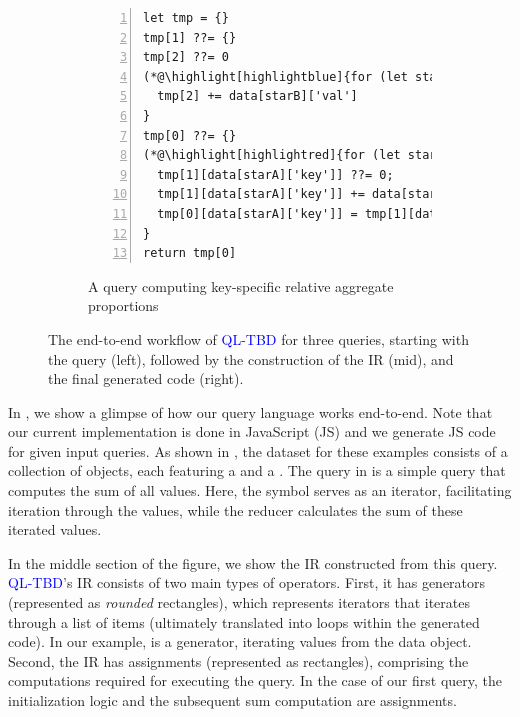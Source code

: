 \documentclass[runningheads]{llncs}
\newcommand{\lang}{\textcolor{blue}{QL-TBD}}
\begin{document}
\begin{figure}[t!]
\begin{subfigure}{\textwidth}
\begin{minipage}{0.54\textwidth}
\begin{lstlisting}[style=JavaScript, columns=flexible, numbers=left, xleftmargin=2pt]
let tmp = {}
tmp[1] ??= {}
tmp[2] ??= 0
(*@\highlight[highlightblue]{for (let starB in data)}@*) {  // loop hoisted!
  tmp[2] += data[starB]['val']
}
tmp[0] ??= {}
(*@\highlight[highlightred]{for (let starA in data)}@*) {
  tmp[1][data[starA]['key']] ??= 0;
  tmp[1][data[starA]['key']] += data[starA]['val']
  tmp[0][data[starA]['key']] = tmp[1][data[starA]['key']] / tmp[2] (*@\label{line:deps}@*)
}
return tmp[0]
\end{lstlisting}
\end{minipage}
\caption{A query computing key-specific relative aggregate proportions}\label{fig:intro_q3}
\end{subfigure}
\caption{
The end-to-end workflow of \lang{} for three queries, starting with the query (left),
followed by the construction of the IR (mid), and the final generated code (right).
}\label{fig:intro}
\end{figure}

In , we show a glimpse of how our query language works end-to-end.
Note that our current implementation is done in JavaScript (JS) and we generate JS
code for given input queries.
As shown in , the dataset for these examples consists of a collection
of objects, each featuring a  and a .
The query in  is a simple query that computes the sum of all
 values.
Here, the \inline{*} symbol serves as an iterator, facilitating iteration through
the  values, while the reducer  calculates the sum of
these iterated values.

In the middle section of the figure, we show the IR constructed from this query.
\lang{}'s IR consists of two main types of operators.
First, it has generators (represented as \emph{rounded} rectangles), which represents iterators
that iterates through a list of items (ultimately translated into loops within
the generated code).
In our example,  is a generator, iterating values from the data object.
Second, the IR has assignments (represented as rectangles), comprising the
computations required for executing the query.
In the case of our first query, the initialization logic  and
the subsequent sum computation  are assignments.
\end{document}
